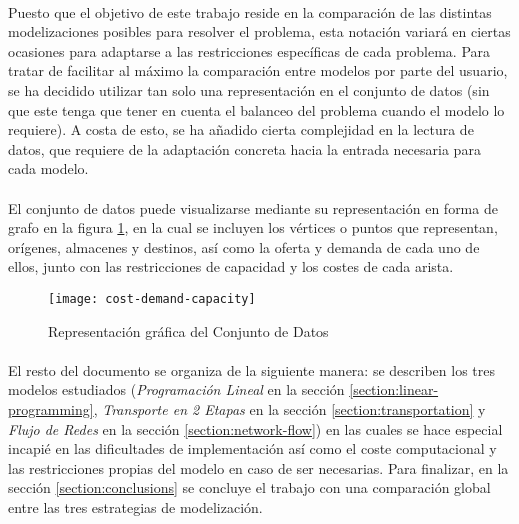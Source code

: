 \documentclass{article}
\begin{document}
    \paragraph{}
    Puesto que el objetivo de este trabajo reside en la comparación de las distintas modelizaciones posibles para resolver el problema, esta notación variará en ciertas ocasiones para adaptarse a las restricciones específicas de cada problema. Para tratar de facilitar al máximo la comparación entre modelos por parte del usuario, se ha decidido utilizar tan solo una representación en el conjunto de datos (sin que este tenga que tener en cuenta el balanceo del problema cuando el modelo lo requiere). A costa de esto, se ha añadido cierta complejidad en la lectura de datos, que requiere de la adaptación concreta hacia la entrada necesaria para cada modelo.

    \paragraph{}
    El conjunto de datos puede visualizarse mediante su representación en forma de grafo en la figura \ref{img:graph-network}, en la cual se incluyen los vértices o puntos que representan, orígenes, almacenes y destinos, así como la oferta y demanda de cada uno de ellos, junto con las restricciones de capacidad y los costes de cada arista.

    \begin{figure}[!hp]
      \centering
      \texttt{[image: cost-demand-capacity]}
      \caption{Representación gráfica del Conjunto de Datos}
      \label{img:graph-network}
    \end{figure}

    \paragraph{}
    El resto del documento se organiza de la siguiente manera: se describen los tres modelos estudiados (\emph{Programación Lineal} en la sección \ref{section:linear-programming}, \emph{Transporte en 2 Etapas} en la sección \ref{section:transportation} y \emph{Flujo de Redes} en la sección \ref{section:network-flow}) en las cuales se hace especial incapié en las dificultades de implementación así como el coste computacional y las restricciones propias del modelo en caso de ser necesarias. Para finalizar, en la sección \ref{section:conclusions} se concluye el trabajo con una comparación global entre las tres estrategias de modelización.
\end{document}
